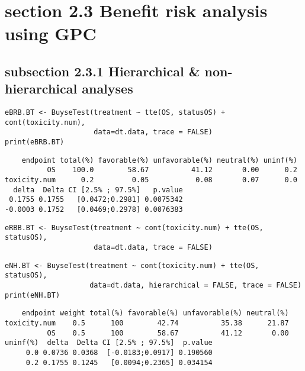 \documentclass[12pt]{article}
\begin{document}
\section{section 2.3 Benefit risk analysis using GPC}
\label{sec:org082a6e7}

\subsection{subsection 2.3.1 Hierarchical \& non-hierarchical analyses}
\label{sec:org8921477}
\lstset{language=r,label= ,caption= ,captionpos=b,numbers=none}
\begin{lstlisting}
eBRB.BT <- BuyseTest(treatment ~ tte(OS, statusOS) + cont(toxicity.num),
                     data=dt.data, trace = FALSE)
print(eBRB.BT)
\end{lstlisting}

\begin{verbatim}
    endpoint total(%) favorable(%) unfavorable(%) neutral(%) uninf(%)
          OS    100.0        58.67          41.12       0.00      0.2
toxicity.num      0.2         0.05           0.08       0.07      0.0
  delta  Delta CI [2.5% ; 97.5%]   p.value
 0.1755 0.1755   [0.0472;0.2981] 0.0075342
-0.0003 0.1752   [0.0469;0.2978] 0.0076383
\end{verbatim}


\lstset{language=r,label= ,caption= ,captionpos=b,numbers=none}
\begin{lstlisting}
eRBB.BT <- BuyseTest(treatment ~ cont(toxicity.num) + tte(OS, statusOS),
                     data=dt.data, trace = FALSE)
\end{lstlisting}

\lstset{language=r,label= ,caption= ,captionpos=b,numbers=none}
\begin{lstlisting}
eNH.BT <- BuyseTest(treatment ~ cont(toxicity.num) + tte(OS, statusOS),
                    data=dt.data, hierarchical = FALSE, trace = FALSE)
print(eNH.BT)
\end{lstlisting}

\begin{verbatim}
    endpoint weight total(%) favorable(%) unfavorable(%) neutral(%)
toxicity.num    0.5      100        42.74          35.38      21.87
          OS    0.5      100        58.67          41.12       0.00
uninf(%)  delta  Delta CI [2.5% ; 97.5%]  p.value
     0.0 0.0736 0.0368  [-0.0183;0.0917] 0.190560
     0.2 0.1755 0.1245   [0.0094;0.2365] 0.034154
\end{verbatim}
\end{document}
